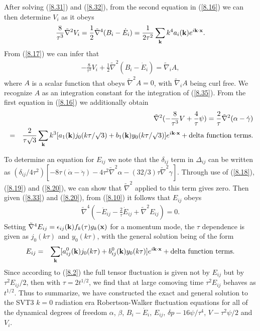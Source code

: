 \documentclass[aps,onecolumn,10pt]{revtex4}
\numberwithin{equation}{section}
\numberwithin{equation}{section}
\begin{document}
After solving (\ref{8.31}) and (\ref{8.32}), from the second equation in (\ref{8.16}) we can then determine $V_i$ as it obeys 
%
\begin{eqnarray}
\frac{8}{\tau^3}\tilde{\nabla}^2V_{i}=\frac{1}{2}\tilde{\nabla}^4(B_i-\dot{E}_i)=\frac{1}{2\tau^2}\sum_{\bf k}k^4a_i({\bf k})e^{i{\bf k}\cdot{\bf x}}.
 \label{8.35}
 \end{eqnarray}
From (\ref{8.17}) we can infer that 
%
\begin{eqnarray}
-\frac{8}{\tau^3}V_{i}+\frac{1}{2}\tilde{\nabla}^2(B_i-\dot{E}_i)=\tilde{\nabla}_iA,
\label{8.36}
\end{eqnarray}
%
where $A$ is a scalar function that obeys $\tilde{\nabla}^2A=0$, with $\tilde{\nabla}_iA$ being curl free. We recognize $A$ as an integration constant for the integration of (\ref{8.35}). From the first equation in (\ref{8.16}) we additionally obtain
%
\begin{eqnarray}
&&\tilde{\nabla}^2(-\frac{8}{\tau^3}V+\frac{4}{\tau}\psi)
 =\frac{2}{\tau}\tilde{\nabla}^2(\alpha-\dot{\gamma})
 \nonumber\\
 &=&\frac{2}{\tau\surd{3}}\sum_{\bf k}k^3[a_1({\bf k})j_0(k\tau/\surd{3})+b_1({\bf k})y_0(k\tau/\surd{3})]e^{i{\bf k}\cdot{\bf x}} + {\rm delta~function~terms.}
 \label{8.37}
 \end{eqnarray}

To determine an equation for $E_{ij}$ we note that the $\delta_{ij}$ term in $\Delta _{ij}$ can be written as 
$(\delta_{ij}/4\tau^2)[-8\tau(\dot{\alpha}-\ddot{\gamma})-4\tau^2\tilde{\nabla}^2\alpha-(32/3)\tau\tilde{\nabla}^2\gamma]$. Through use of (\ref{8.18}), (\ref{8.19}) and (\ref{8.20}), we can show that $\tilde{\nabla}^2$ applied to this term gives zero. Then given (\ref{8.33}) and (\ref{8.20}), from (\ref{8.10}) it follows that $E_{ij}$ obeys 
%
\begin{eqnarray}
 \tilde{\nabla}^4\left(-\ddot{E}_{ij}-\frac{2}{\tau}\dot{E}_{ij}+\tilde{\nabla}^2E_{ij}\right)=0.
\label{8.38}
\end{eqnarray}
%
Setting $\tilde{\nabla}^4E_{ij}=\epsilon_{ij}({\bf k})f_k(\tau)g_k({\bf x})$ for a momentum mode, the $\tau$ dependence  is given as $j_0(k\tau)$ and $y_0(k\tau)$, with the general solution being of the form
%
\begin{eqnarray}
E_{ij}&=&\sum_{\bf k}[a^0_{ij}({\bf k})j_0(k\tau)+b^0_{ij}({\bf k})y_0(k\tau)]e^{i{\bf k}\cdot{\bf x}}
+ {\rm delta~function~terms}.
\label{8.39}
\end{eqnarray}
%
Since according to (\ref{8.2}) the full tensor fluctuation is given not by $E_{ij}$ but by $\tau^2E_{ij}/2$, then with $\tau=2t^{1/2}$, we find that at large comoving time  $\tau^2 E_{ij}$ behaves as $t^{1/2}$. Thus to summarize,  we have constructed the exact and general solution to the SVT3 $k=0$ radiation era Robertson-Walker fluctuation equations for all of the dynamical degrees of freedom $\alpha$, $\beta$, $B_i-\dot{E}_i$, $E_{ij}$, $\delta p-16\psi/\tau^4$, $V-\tau^2\psi/2$ and $V_i$. 
\end{document}
